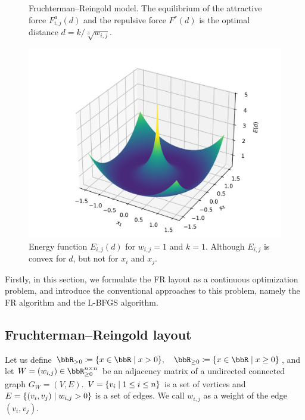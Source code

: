 \documentclass[dvipdfmx,journal]{IEEEtran}
\newcommand{\defeq}{\coloneqq}
\begin{document}
\begin{figure}[t]
\begin{minipage}{0.49\hsize}
    \caption{
      Fruchterman--Reingold model.
      The equilibrium of the attractive force $F_{i,j}^a(d)$ and the repulsive force $F^r(d)$ is the optimal distance $d=k/\sqrt[3]{w_{i,j}}$.
    }
  \end{minipage}
  \begin{minipage}{0.49\hsize}
    \centering
    \includegraphics[width=\columnwidth]{energy_3d.png}
    \caption{Energy function $E_{i,j}(d)$ for $w_{i,j} = 1$ and $k = 1$. Although $E_{i,j}$ is convex for $d$, but not for $x_i$ and $x_j$.}
    \label{fig:label}
  \end{minipage}
\end{figure}

Firstly, in this section, we formulate the FR layout as a continuous optimization problem, and introduce the conventional approaches to this problem, namely the FR algorithm and the L-BFGS algorithm.

\subsection{Fruchterman--Reingold layout}\label{ssec:frLayout}

Let us define
$\bbR_{> 0} \defeq \qty{ x \in \bbR \mid x > 0 }, \quad \bbR_{\geq 0} \defeq \qty{ x \in \bbR \mid x \geq 0 }$,
and let $W = (w_{i,j}) \in \bbR_{\geq 0}^{n \times n}$ be an adjacency matrix of a undirected connected graph $G_W = (V, E)$. $V = \qty{v_i \mid 1 \leq i \leq n}$ is a set of vertices and $E = \qty{(v_i, v_j) \mid w_{i,j} > 0}$ is a set of edges. We call $w_{i,j}$ as a weight of the edge $(v_i, v_j)$.
\end{document}

